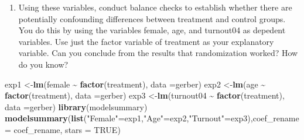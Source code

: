 \documentclass[
]{article}
\newenvironment{Shaded}{\begin{snugshade}}{\end{snugshade}}
\newcommand{\AttributeTok}[1]{\textcolor[rgb]{0.13,0.29,0.53}{#1}}
\newcommand{\ConstantTok}[1]{\textcolor[rgb]{0.56,0.35,0.01}{#1}}
\newcommand{\FunctionTok}[1]{\textcolor[rgb]{0.13,0.29,0.53}{\textbf{#1}}}
\newcommand{\NormalTok}[1]{#1}
\newcommand{\OtherTok}[1]{\textcolor[rgb]{0.56,0.35,0.01}{#1}}
\newcommand{\SpecialCharTok}[1]{\textcolor[rgb]{0.81,0.36,0.00}{\textbf{#1}}}
\newcommand{\StringTok}[1]{\textcolor[rgb]{0.31,0.60,0.02}{#1}}
\providecommand{\tightlist}{%
  \setlength{\itemsep}{0pt}\setlength{\parskip}{0pt}}
\begin{document}
\begin{enumerate}
\def\labelenumi{\arabic{enumi}.}
\setcounter{enumi}{2}
\tightlist
\item
  Using these variables, conduct balance checks to establish whether
  there are potentially confounding differences between treatment and
  control groups. You do this by using the variables female, age, and
  turnout04 as depedent variables. Use just the factor variable of
  treatment as your explanatory variable. Can you conclude from the
  results that randomization worked? How do you know?
\end{enumerate}

\begin{Shaded}
\begin{Highlighting}[]
\NormalTok{exp1 }\OtherTok{\textless{}{-}}\FunctionTok{lm}\NormalTok{(female }\SpecialCharTok{\textasciitilde{}} \FunctionTok{factor}\NormalTok{(treatment), }\AttributeTok{data =}\NormalTok{gerber)}
\NormalTok{exp2 }\OtherTok{\textless{}{-}}\FunctionTok{lm}\NormalTok{(age }\SpecialCharTok{\textasciitilde{}} \FunctionTok{factor}\NormalTok{(treatment), }\AttributeTok{data =}\NormalTok{gerber)}
\NormalTok{exp3 }\OtherTok{\textless{}{-}}\FunctionTok{lm}\NormalTok{(turnout04 }\SpecialCharTok{\textasciitilde{}} \FunctionTok{factor}\NormalTok{(treatment), }\AttributeTok{data =}\NormalTok{gerber)}
\FunctionTok{library}\NormalTok{(modelsummary)}
\FunctionTok{modelsummary}\NormalTok{(}\FunctionTok{list}\NormalTok{(}\StringTok{"Female"}\OtherTok{=}\NormalTok{exp1,}\StringTok{"Age"}\OtherTok{=}\NormalTok{exp2,}\StringTok{"Turnout"}\OtherTok{=}\NormalTok{exp3),}\AttributeTok{coef\_rename =}\NormalTok{ coef\_rename, }\AttributeTok{stars =} \ConstantTok{TRUE}\NormalTok{)}
\end{Highlighting}
\end{Shaded}
\end{document}
